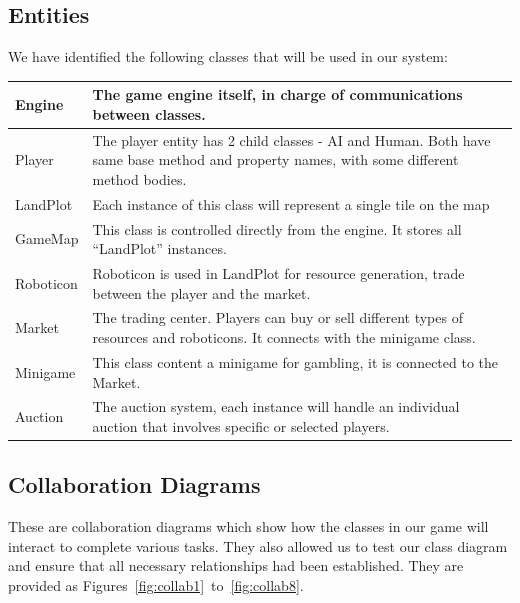 \subsection{Entities}
We have identified the following classes that will be used in our system: \\

\begin{tabular}{|l|p{13cm}|}
	\hline
	Engine & The game engine itself, in charge of communications between classes. \\ \hline
	Player & The player entity has 2 child classes - AI and Human. Both have same base method and property names, with some different method bodies. \\ \hline
	LandPlot & Each instance of this class will represent a single tile on the map \\ \hline
	GameMap & This class is controlled directly from the engine. It stores all “LandPlot” instances. \\ \hline
	Roboticon & Roboticon is used in LandPlot for resource generation, trade between the player and the market. \\ \hline
	Market &The trading center. Players can buy or sell different types of resources and roboticons. It connects with the minigame class. \\ \hline
	Minigame & This class content a minigame for gambling, it is connected to the Market. \\ \hline
	Auction & The auction system, each instance will handle an individual auction that involves specific or selected players. \\ \hline
	
\end{tabular}

\subsection{Collaboration Diagrams}
These are collaboration diagrams which show how the classes in our game will interact to complete various tasks.
They also allowed us to test our class diagram and ensure that all necessary relationships had been established.
They are provided as Figures~\ref{fig:collab1}~to~\ref{fig:collab8}.

